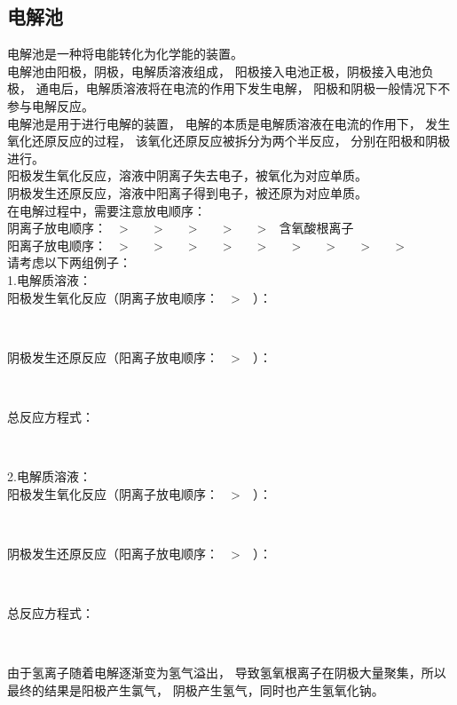 \documentclass[UTF8]{ctexart}
\begin{document}
\newpage

\subsection{电解池}
    电解池是一种将电能转化为化学能的装置。\\[3mm]
    电解池由阳极，阴极，电解质溶液组成，
    阳极接入电池正极，阴极接入电池负极，
    通电后，电解质溶液将在电流的作用下发生电解，
    阳极和阴极一般情况下不参与电解反应。\\[3mm]
    电解池是用于进行电解的装置，
    电解的本质是电解质溶液在电流的作用下，
    发生氧化还原反应的过程，
    该氧化还原反应被拆分为两个半反应，
    分别在阳极和阴极进行。\\[2mm]
    阳极发生氧化反应，溶液中阴离子失去电子，被氧化为对应单质。\\[1mm]
    阴极发生还原反应，溶液中阳离子得到电子，被还原为对应单质。\\[3mm]  
    在电解过程中，需要注意放电顺序：\\[2mm]
    阴离子放电顺序：~~>~~~~>~~~~>~~~~>~~~~>~~含氧酸根离子\\[2mm]
    阳离子放电顺序：~~>~~~~>~~~~>~~~~>~~~~>~~~~>~~~~>~~~~>~~~~>~~\\[4mm]
    请考虑以下两组例子：\\[3mm]
    1.电解质溶液：\\[3mm]
    阳极发生氧化反应（阴离子放电顺序：~~>~~）：
    \begin{center}
        \\[5mm]
    \end{center}
    阴极发生还原反应（阳离子放电顺序：~~>~~）：
    \begin{center}
        \\[3mm]
    \end{center}
    总反应方程式：
    \begin{center}
        \\[6mm]
    \end{center}
    2.电解质溶液：\\[3mm]
    阳极发生氧化反应（阴离子放电顺序：~~>~~）：
    \begin{center}
        \\[5mm]
    \end{center}
    阴极发生还原反应（阳离子放电顺序：~~>~~）：
    \begin{center}
        \\[3mm]
    \end{center}
    总反应方程式：
    \begin{center}
        \\[5mm]
    \end{center}
    由于氢离子随着电解逐渐变为氢气溢出，
    导致氢氧根离子在阴极大量聚集，所以最终的结果是阳极产生氯气，
    阴极产生氢气，同时也产生氢氧化钠。
\end{document}

